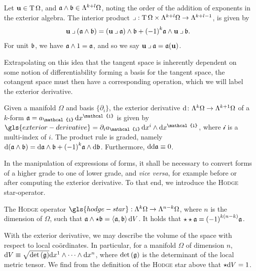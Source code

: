 \begin{definition}
  Let $\mathbf{u} \in \operatorname{T}\Omega$, and $\mathfrak{a}\wedge\mathfrak{b} \in \Lambda^{k+l}\Omega$, noting the order of the addition of exponents in the exterior algebra.
  The interior product $\iprod: \Tangent\Omega \times \Lambda^{k + l}\Omega \to \Lambda^{k + l - 1}$, is given by
  \[
        \uvec\iprod(\afrak\wedge\bfrak) = (\uvec\iprod\afrak)\wedge\bfrak + {(-1)}^{k}\afrak\wedge\uvec\iprod\bfrak.
  \]
  For unit $\mathfrak{b}$, we have $\mathfrak{a} \wedge 1 = \mathfrak{a}$, and so we say $\uvec \iprod \afrak = \afrak(\uvec)$.
\end{definition}

\noindent
Extrapolating on this idea that the tangent space is inherently dependent on some notion of differentiability forming a basis for the tangent space, the cotangent space must then have a corresponding operation, which we will label the exterior derivative.

\begin{definition}
  Given a manifold $\Omega$ and basis $\{ \partial_{i}\}$, the exterior derivative $\mathrm{d} \colon \Lambda^k \Omega \to \Lambda^{k+1} \Omega$ of a $k$-form $\afrak = a_{\mathcal{i}}\,\dee x^{\mathcal{i}}$ is given by $\gls{exterior-derivative} = \partial_{i} a_{\mathcal{i}} \,\dee x^{i} \wedge \dee x^{\mathcal{i}}$, where $\mathcal{i}$ is a multi-index of $i$.
  The product rule is graded, namely $\mathrm{d}(\mathfrak{a}\wedge\mathfrak{b}) = \mathrm{d}\mathfrak{a}\wedge\mathfrak{b} + {(-1)}^k \mathfrak{a}\wedge\mathrm{d}\mathfrak{b}$.
  Furthermore, $\mathrm{d}\mathrm{d}\mathfrak{a} \equiv 0$.
\end{definition}

\noindent
In the manipulation of expressions of forms, it shall be necessary to convert forms of a higher grade to one of lower grade, and \emph{vice versa}, for example before or after computing the exterior derivative.
To that end, we introduce the \textsc{Hodge} star-operator.

\begin{definition}
  The \textsc{Hodge} operator $\gls{hodge-star}: \Lambda^{k}\Omega \to \Lambda^{n-k}\Omega$, where $n$ is the dimension of $\Omega$, such that $\mathfrak{a} \wedge \star\mathfrak{b} = \langle \mathfrak{a}, \mathfrak{b} \rangle \,\mathrm{d} V$.
  It holds that $\star\star\mathfrak{a} = {(-1)}^{k(n-k)}\mathfrak{a}$.
\end{definition}

\noindent
With the exterior derivative, we may describe the volume of the space with respect to local coördinates.
In particular, for a manifold $\Omega$ of dimension $n$, $\mathrm{d} V \equiv \sqrt{\det{(\mathfrak{g})}} \mathrm{d} x^{1} \wedge \cdots \wedge \mathrm{d} x^{n}$, where $\det{(\mathfrak{g})}$ is the determinant of the local metric tensor.
We find from the definition of the \textsc{Hodge} star above that $\star\mathrm{d} V = 1$.

